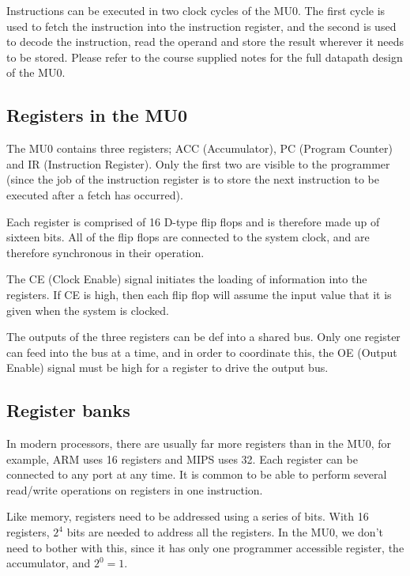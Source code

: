 Instructions can be executed in two clock cycles of the MU0. The first cycle is
used to fetch the instruction into the instruction register, and the second is
used to decode the instruction, read the operand and store the result wherever
it needs to be stored. Please refer to the course supplied notes for the full
datapath design of the MU0.

\subsection{Registers in the MU0}

The MU0 contains three registers; ACC (Accumulator), PC (Program Counter) and IR
(Instruction Register). Only the first two are visible to the programmer (since
the job of the instruction register is to store the next instruction to be
executed after a fetch has occurred).

Each register is comprised of 16 D-type flip flops and is therefore made up of
sixteen bits. All of the flip flops are connected to the system clock, and are
therefore synchronous in their operation.

The CE (Clock Enable) signal initiates the loading of information into the
registers. If CE is high, then each flip flop will assume the input value that
it is given when the system is clocked.

The outputs of the three registers can be def into a shared bus. Only one
register can feed into the bus at a time, and in order to coordinate this, the
OE (Output Enable) signal must be high for a register to drive the output bus.

\subsection{Register banks}

In modern processors, there are usually far more registers than in the MU0, for
example, ARM uses 16 registers and MIPS uses 32. Each register can be connected
to any port at any time. It is common to be able to perform several read/write
operations on registers in one instruction.

Like memory, registers need to be addressed using a series of bits. With 16
registers, $2^{4}$ bits are needed to address all the registers. In the MU0, we
don't need to bother with this, since it has only one programmer accessible
register, the accumulator, and $2^0=1$.

